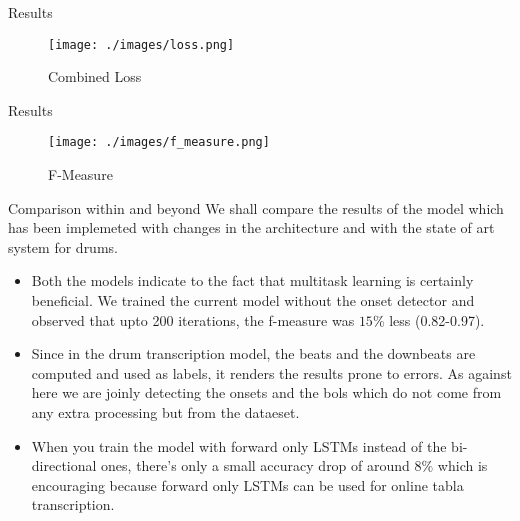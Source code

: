 \begin{frame}[t,fragile]{Results}
\begin{figure}[h!]
  \texttt{[image: ./images/loss.png]}
  \caption{Combined Loss}
  \label{}
\end{figure}
\end{frame}

\begin{frame}[t,fragile]{Results}
\begin{figure}[h!]
  \texttt{[image: ./images/f\_measure.png]}
  \caption{F-Measure}
  \label{}
\end{figure}
\end{frame}




\begin{frame}[t,fragile]{Comparison within and beyond}
We shall compare the results of the model which has been implemeted with changes in the architecture and with the state of art system for drums. 
\begin{itemize}
\item Both the models indicate to the fact that multitask learning is certainly beneficial. We trained the current model without the onset detector and observed that upto 200 iterations, the f-measure was $15\%$ less (0.82-0.97).  
\item Since in the drum transcription model, the beats and the downbeats are computed and used as labels, it renders the results prone to errors. As against here we are joinly detecting the onsets and the bols which do not come from any extra processing but from the dataeset. 
\item When you train the model with forward only LSTMs instead of the bi-directional ones, there's only a small accuracy drop of around $8\%$ which is encouraging because forward only LSTMs can be used for online tabla transcription.
\end{itemize}
\end{frame}


